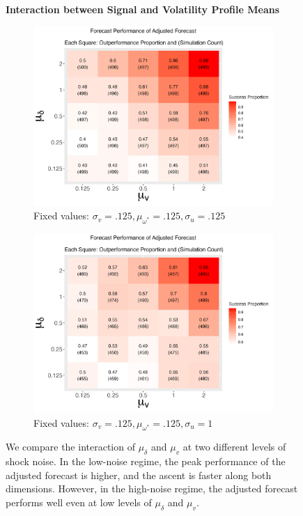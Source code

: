 \documentclass{uiucthesis2021}
\theoremstyle{definition}
\begin{document}
  \begin{figure}[!h]
    \centering
    \textbf{Interaction between Signal and Volatility Profile Means}\par\medskip
  \begin{subfigure}{.44\linewidth} 
    \centering
      \includegraphics[scale = .42]{simulation_plots/Aug28_224330_2024_mu[delta]_mu[v].png}
      \caption{Fixed values: $\sigma_{v} = .125, \mu_{\omega^{*}} = .125, \sigma_{u} = .125$}\label{fig:sim_4}
  \end{subfigure}\hspace{12mm} %
  \begin{subfigure}{.44\linewidth} 
    \centering
      \includegraphics[scale=.42]{simulation_plots/Aug28_224337_2024_mu[delta]_mu[v].png}
      \caption{Fixed values: $\sigma_{v} = .125, \mu_{\omega^{*}} = .125, \sigma_{u} = 1$}\label{fig:sim_5}
  \end{subfigure}
  
      \caption{We compare the interaction of $\mu_{\delta}$ and $\mu_{v}$ at two different levels of shock noise.  In the low-noise regime, the peak performance of the adjusted forecast is higher, and the ascent is faster along both dimensions.   However, in the high-noise regime, the adjusted forecast performs well even at low levels of $\mu_{\delta}$ and $\mu_{v}$.}
      \label{fig:sig_volprof}
    \end{figure}
\end{document}
